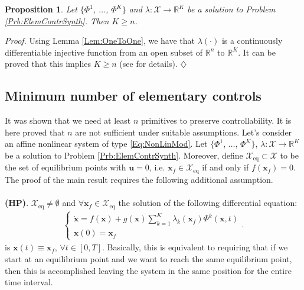 \documentclass{svmult}
\newcommand{\x}{\mathbf {x}}
\newcommand{\ProofBegin}{{\em Proof.} }
\newcommand{\ProofEnd}{\hfill $\diamondsuit$\\}
\newtheorem{fact}[theorem]{Proposition}
\begin{document}
\begin{fact} \label{Pro:LowerBound}
Let $\{\Phi^1$, $\dots$, $\Phi^K\}$ and $\lambda : \mathcal X
\rightarrow \mathbb R^K$ be a solution to Problem
\ref{Prb:ElemContrSynth}. Then $K \geq n$.
\end{fact}

\ProofBegin Using Lemma \ref{Lem:OneToOne}, we have that
$\lambda(\cdot)$ is a continuously differentiable injective
function from an open subset of $\mathbb R^n$ to $\mathbb R^K$. It
can be proved that this implies $K \geq n$ (see \cite{Boothby} for 
details). \ProofEnd



\subsection{Minimum number of elementary controls} \label{Sec:MinNumPrimitivesNonLin}

It was shown that we need at least $n$ 
primitives to preserve controllability. It is here proved that $n$ are not
sufficient under suitable assumptions. Let's consider an affine nonlinear system 
of type \eqref{Eq:NonLinMod}. Let $\{\Phi^1$, $\dots$, $\Phi^K\}$, $\lambda 
: \mathcal X \rightarrow \mathbb R^K$ be a solution to Problem 
\ref{Prb:ElemContrSynth}. Moreover, define $\mathcal
X_{\mbox{eq}} \subset \mathcal X$ to be the set of equilibrium
points with $\mathbf u = 0$, i.e. $\mathbf x_f \in \mathcal
X_{\mbox{eq}}$ if and only if $f(\mathbf x_f) = 0$. The proof of
the main result requires the following additional assumption.
\\
\\
\textbf{(HP)}. $\mathcal X_{\mbox{eq}} \neq \emptyset$ and
$\forall \x_f \in \mathcal X_{\mbox{eq}}$ the solution of the
following differential equation:
\begin{eqnarray}
\left\{ \begin{array} {l} \mathbf {\dot x} = f (\mathbf x) +
g(\mathbf x) \sum_{k=1}^K \lambda_k(\x_f) \Phi^k(\x, t)\\
\mathbf x(0) = \x_f
\end{array} \right. .
\end{eqnarray}
is $\mathbf x(t) \equiv \mathbf x_f$, $\forall t \in [0, T]$.
Basically, this is equivalent to requiring that if we start at an
equilibrium point and we want to reach the same equilibrium point,
then this is accomplished leaving the system in the same position
for the entire time interval.
\end{document}
